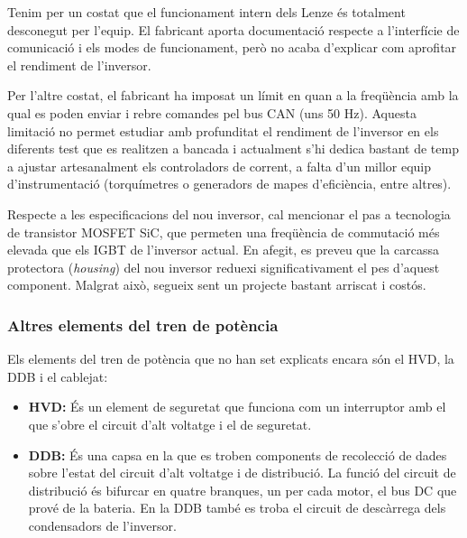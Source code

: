 {{        Tenim per un costat que el funcionament intern dels Lenze és totalment
        desconegut per l'equip. El fabricant aporta documentació respecte a
        l'interfície de comunicació i els modes de funcionament, però no acaba
        d'explicar com aprofitar el rendiment de l'inversor. 
        
        Per l'altre costat, el fabricant ha imposat un límit en quan a la
        freqüència amb la qual es poden enviar i rebre comandes pel bus CAN
        (uns 50 Hz). Aquesta limitació no permet estudiar amb profunditat el
        rendiment de l'inversor en els diferents test que es realitzen a
        bancada i actualment s'hi dedica bastant de temp a ajustar
        artesanalment els controladors de corrent, a falta d'un millor equip
        d'instrumentació (torquímetres o generadors de mapes d'eficiència,
        entre altres).

        Respecte a les especificacions del nou inversor, cal mencionar el pas a
        tecnologia de transistor MOSFET \ac{SiC}, que permeten una freqüència
        de commutació més elevada que els IGBT de l'inversor actual. En afegit,
        es preveu que la carcassa protectora (\emph{housing}) del nou inversor
        reduexi significativament el pes d'aquest component. Malgrat això,
        segueix sent un projecte bastant arriscat i costós.
    } 

    \subsubsection{ Altres elements del tren de potència }
    {
        Els elements del tren de potència que no han set explicats encara són el
        \ac{HVD}, la \ac{DDB} i el cablejat:

        \begin{itemize}
            \item \textbf{\Acl{HVD}:} 
                És un element de seguretat que funciona com un interruptor amb el
                que s'obre el circuit d'alt voltatge i el de seguretat. 

            \item \textbf{\Acl{DDB}:}
                És una capsa en la que es troben components de recolecció de
                dades sobre l'estat del circuit d'alt voltatge i de
                distribució. La funció del circuit de distribució és bifurcar
                en quatre branques, un per cada motor, el bus DC que prové de
                la bateria. En la \ac{DDB} també es troba el circuit de
                descàrrega dels condensadors de l'inversor.


\end{itemize}}}
